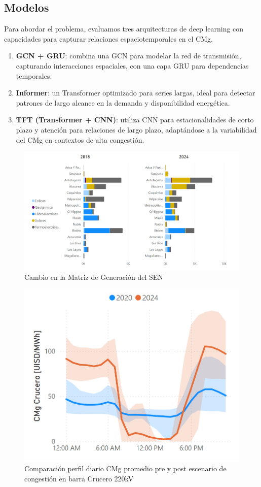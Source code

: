 \documentclass[twocolumn]{article}
\begin{document}
\subsection{Modelos}
Para abordar el problema, evaluamos tres arquitecturas de deep learning con capacidades para capturar relaciones espaciotemporales en el CMg.
\begin{enumerate}
    \item \textbf{GCN + GRU}: combina una GCN para modelar la red de transmisión, capturando interacciones espaciales, con una capa GRU para dependencias temporales.
    \item \textbf{Informer}: un Transformer optimizado para series largas, ideal para detectar patrones de largo alcance en la demanda y disponibilidad energética.
    \item \textbf{TFT (Transformer + CNN)}: utiliza CNN para estacionalidades de corto plazo y atención para relaciones de largo plazo, adaptándose a la variabilidad del CMg en contextos de alta congestión.
\end{enumerate}

\begin{figure}[htbp]
    \centering
    \includegraphics[width=1\columnwidth]{imgs/matriz_sist.png}
    \caption{Cambio en la Matriz de Generación del SEN}
    \label{fig:matriz_sistema}
\end{figure}

\begin{figure}[htbp]
    \centering
    \includegraphics[width=0.8\columnwidth]{imgs/cmg_comparacion.png}
    \caption{Comparación perfil diario CMg promedio pre y post escenario de congestión en barra Crucero 220kV}
    \label{fig:comp_cmg}
\end{figure}
\end{document}
